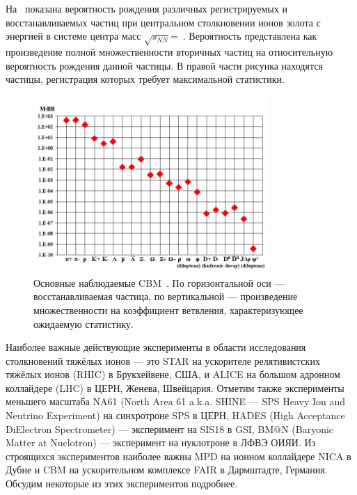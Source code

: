На~ показана вероятность рождения различных регистрируемых и восстанавливаемых частиц при центральном столкновении ионов золота с энергией в системе центра масс $\sqrt{s_{NN}}$=\todo~\GeVperNucl{}. Вероятность представлена как произведение полной множественности вторичных частиц на относительную вероятность рождения данной частицы. В правой части рисунка находятся частицы, регистрация которых требует максимальной статистики.

\begin{figure}[H]
\includegraphics[width=0.8\textwidth]{pictures/CBM_observables.png}
\caption{Основные наблюдаемые CBM~\cite{CBMBook}. По горизонтальной оси --- восстанавливаемая частица, по вертикальной --- произведение множественности на коэффициент ветвления, характеризующее ожидаемую статистику.}
\label{fig:CBMParticlesYields}
\end{figure}



Наиболее важные действующие эксперименты в области исследования столкновений тяжёлых ионов --- это STAR на ускорителе релятивистских тяжёлых ионов (RHIC) в Брукхейвене, США, и ALICE на большом адронном коллайдере (LHC) в ЦЕРН, Женева, Швейцария. Отметим также эксперименты меньшего масштаба NA61 (North Area 61 a.k.a. SHINE --- SPS Heavy Ion and Neutrino Experiment) на синхротроне SPS в ЦЕРН, HADES (High Acceptance DiElectron Spectrometer) --- эксперимент на SIS18 в GSI, BM$@$N (Baryonic Matter at Nuclotron) --- эксперимент на нуклотроне в ЛФВЭ ОИЯИ. Из строящихся экспериментов наиболее важны MPD на ионном коллайдере NICA в Дубне и CBM на ускорительном комплексе FAIR в Дармштадте, Германия. Обсудим некоторые из этих экспериментов подробнее.

